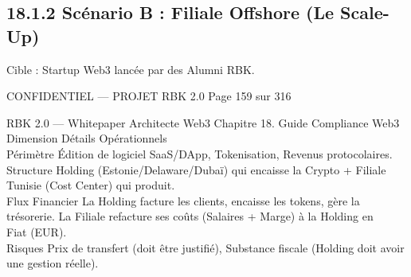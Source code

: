 \subsection{18.1.2 Scénario B : Filiale Offshore (Le Scale-Up)}
Cible : Startup Web3 lancée par des Alumni RBK.\\
\vspace{0.5em}
\vspace{0.5em}
\vspace{0.5em}
\vspace{0.5em}
\begin{confidential}CONFIDENTIEL — PROJET RBK 2.0                                  Page 159 sur 316\end{confidential}
RBK 2.0 — Whitepaper Architecte Web3                                                                             Chapitre 18. Guide Compliance Web3\\
\vspace{0.5em}
\vspace{0.5em}
\vspace{0.5em}
Dimension      Détails Opérationnels\\
Périmètre      Édition de logiciel SaaS/DApp, Tokenisation, Revenus protocolaires.\\
Structure      Holding (Estonie/Delaware/Dubaï) qui encaisse la Crypto + Filiale Tunisie (Cost Center) qui produit.\\
Flux Financier La Holding facture les clients, encaisse les tokens, gère la trésorerie. La Filiale refacture ses coûts (Salaires + Marge) à la Holding en\\
Fiat (EUR).\\
Risques        Prix de transfert (doit être justifié), Substance fiscale (Holding doit avoir une gestion réelle).\\
\vspace{0.5em}
\vspace{0.5em}
\vspace{0.5em}
